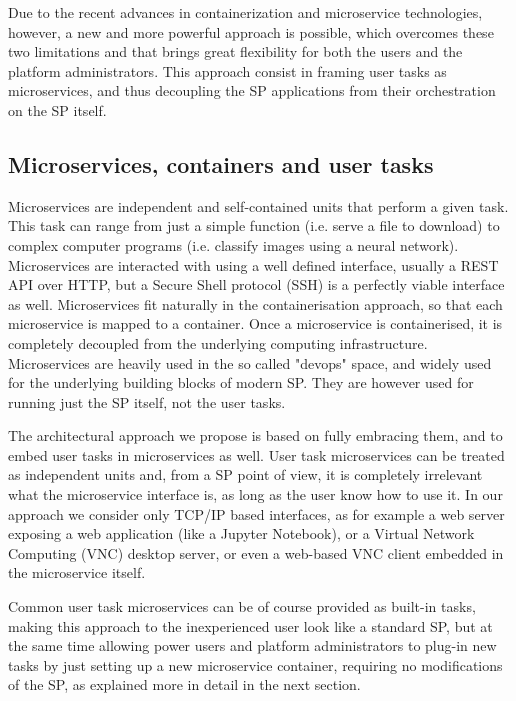 \documentclass[11pt,twoside]{article}
\begin{document}
Due to the recent advances in containerization and microservice technologies, however, a new and more powerful approach is possible, which overcomes these two limitations and that brings great flexibility for both the users and the platform administrators. This approach consist in framing user tasks as microservices, and thus decoupling the SP applications from their orchestration on the SP itself.


\subsection{Microservices, containers  and user tasks}
Microservices are independent and self-contained units that perform a given task. This task can range from just a simple function (i.e. serve a file to download) to complex computer programs (i.e. classify images using a neural network). Microservices are interacted with using a well defined interface, usually a REST API over HTTP, but a Secure Shell protocol (SSH) is a perfectly viable interface as well. Microservices fit naturally in the containerisation approach, so that each microservice is mapped to a container. Once a microservice is containerised, it is completely decoupled from the underlying computing infrastructure.
Microservices are heavily used in the so called "devops" space, and widely used for the underlying building blocks of modern SP. They are however used for running just the SP itself, not the user tasks.

The architectural approach we propose is based on fully embracing them, and to embed user tasks in microservices as well. User task microservices can be treated as independent units and, from a SP point of view, it is completely irrelevant what the microservice interface is, as long as the user know how to use it. In our approach we consider only TCP/IP based interfaces, as for example a web server exposing a web application (like a Jupyter Notebook), or a Virtual Network Computing (VNC) desktop server, or even a web-based VNC client embedded in the microservice itself. 

Common user task microservices can be of course provided as built-in tasks, making this approach to the inexperienced user look like a standard SP, but at the same time allowing power users and platform administrators to plug-in new tasks by just setting up a new microservice container, requiring no modifications of the SP, as explained more in detail in the next section.


\end{document}
